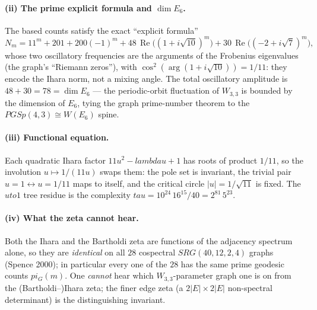 \documentclass[12pt,a4paper]{article}
\def\mathrm#1{#1}%
\def\mathbf#1{#1}%
\def\textbf#1{#1}%
\def\lambda{lambda}%
\def\pi{pi}%
\def\tau{tau}%
\def\to{ to }%
\theoremstyle{definition}
\newcommand{\SRG}{\mathrm{SRG}}
\begin{document}
\paragraph{(ii) The prime explicit formula and $\dim E_6$.}
The based counts satisfy the exact ``explicit formula''
\[
N_m = 11^m + 201 + 200(-1)^m
      + 48\,\operatorname{Re}\!\bigl((1+i\sqrt{10})^m\bigr)
      + 30\,\operatorname{Re}\!\bigl((-2+i\sqrt{7})^m\bigr),
\]
whose two oscillatory frequencies are the arguments of the Frobenius
eigenvalues (the graph's ``Riemann zeros''), with
$\cos^2(\arg(1+i\sqrt{10})) = 1/11$: they encode the Ihara norm, not a
mixing angle.  The total oscillatory amplitude is
$48+30 = \mathbf{78} = \dim E_6$ --- the periodic-orbit fluctuation of
$W_{3,3}$ is bounded by the dimension of $E_6$, tying the graph
prime-number theorem to the $\mathrm{PGSp}(4,3)\cong W(E_6)$ spine.

\paragraph{(iii) Functional equation.}
Each quadratic Ihara factor $11u^2-\lambda u+1$ has roots of product
$1/11$, so the involution $u\mapsto 1/(11u)$ swaps them: the pole set is
invariant, the trivial pair $u=1\leftrightarrow u=1/11$ maps to itself,
and the critical circle $|u|=1/\sqrt{11}$ is fixed.  The $u\to1$ tree
residue is the complexity $\tau = 10^{24}\,16^{15}/40 = 2^{81}\,5^{23}$.

\paragraph{(iv) What the zeta cannot hear.}
Both the Ihara and the Bartholdi zeta are functions of the adjacency
spectrum alone, so they are \emph{identical} on all $28$ cospectral
$\SRG(40,12,2,4)$ graphs (Spence 2000); in particular every one of the
$28$ has the same prime geodesic counts $\pi_G(m)$.  One \emph{cannot}
hear which $W_{3,3}$-parameter graph one is on from the (Bartholdi--)Ihara
zeta; the finer \textbf{edge zeta} (a $2|E|\times2|E|$ non-spectral
determinant) is the distinguishing invariant.
\end{document}
